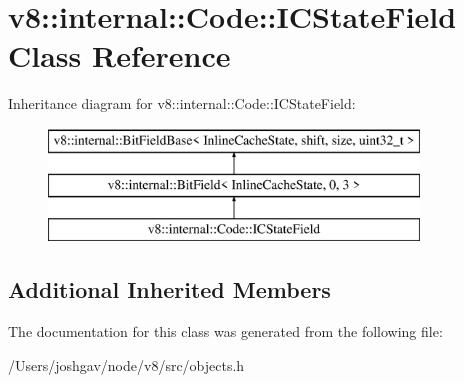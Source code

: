 \hypertarget{classv8_1_1internal_1_1_code_1_1_i_c_state_field}{}\section{v8\+:\+:internal\+:\+:Code\+:\+:I\+C\+State\+Field Class Reference}
\label{classv8_1_1internal_1_1_code_1_1_i_c_state_field}
Inheritance diagram for v8\+:\+:internal\+:\+:Code\+:\+:I\+C\+State\+Field\+:\begin{figure}[H]
\begin{center}
\leavevmode
\includegraphics[height=3.000000cm]{classv8_1_1internal_1_1_code_1_1_i_c_state_field}
\end{center}
\end{figure}
\subsection*{Additional Inherited Members}


The documentation for this class was generated from the following file\+:\begin{DoxyCompactItemize}
\item 
/\+Users/joshgav/node/v8/src/objects.\+h\end{DoxyCompactItemize}
